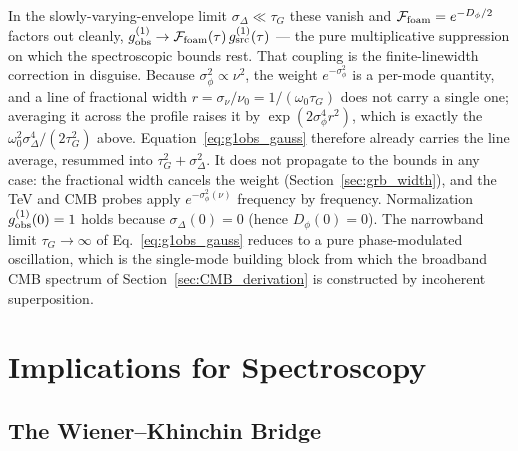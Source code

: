 \documentclass[aps,prd,onecolumn,amsmath,amssymb]{revtex4-2}
\begin{document}
In the slowly-varying-envelope limit $\sigma_\Delta\ll\tau_G$ these vanish
and $\mathcal{F}_{\rm foam}=e^{-D_\phi/2}$ factors out cleanly,
$g^{(1)}_{\rm obs}\to\mathcal{F}_{\rm foam}(\tau)\,g^{(1)}_{\rm src}(\tau)$ ---
the pure multiplicative suppression on which the spectroscopic bounds rest.
That coupling is the finite-linewidth correction in disguise.  Because
$\sigma_\phi^2\propto\nu^2$, the weight $e^{-\sigma_\phi^2}$ is a per-mode
quantity, and a line of fractional width
$r=\sigma_\nu/\nu_0=1/(\omega_0\tau_G)$ does not carry a single one;
averaging it across the profile raises it by $\exp(2\sigma_\phi^4r^2)$, which
is exactly the $\omega_0^2\sigma_\Delta^4/(2\tau_G^2)$ above.
Equation~\eqref{eq:g1obs_gauss} therefore already carries the line average,
resummed into $\tau_G^2+\sigma_\Delta^2$.  It does not propagate to the
bounds in any case: the fractional width cancels the weight
(Section~\ref{sec:grb_width}), and the TeV and CMB probes apply
$e^{-\sigma_\phi^2(\nu)}$ frequency by frequency.
Normalization $g^{(1)}_{\rm obs}(0)=1$ holds because $\sigma_\Delta(0)=0$
(hence $D_\phi(0)=0$).
The narrowband limit $\tau_G\to\infty$ of
Eq.~\eqref{eq:g1obs_gauss} reduces to a pure phase-modulated
oscillation, which is the single-mode building block from which the
broadband CMB spectrum of Section~\ref{sec:CMB_derivation} is
constructed by incoherent superposition.

\section{Implications for Spectroscopy}
\label{sec:spec}

\subsection{The Wiener--Khinchin Bridge}
\end{document}
